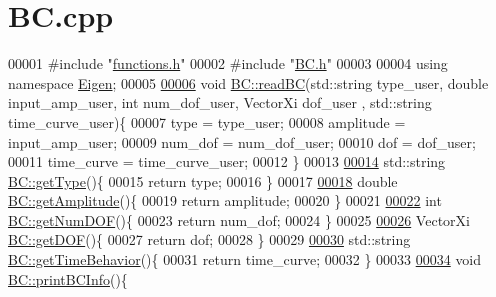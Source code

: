 \hypertarget{_b_c_8cpp_source}{}\section{B\+C.\+cpp}
\label{_b_c_8cpp_source}

\begin{DoxyCode}
00001 \textcolor{preprocessor}{#include "\hyperlink{functions_8h}{functions.h}"}
00002 \textcolor{preprocessor}{#include "\hyperlink{_b_c_8h}{BC.h}"}
00003 
00004 \textcolor{keyword}{using namespace }\hyperlink{namespace_eigen}{Eigen};
00005 
\hyperlink{class_b_c_a8ceaa781f98b4128fa50611ff9481e1a}{00006} \textcolor{keywordtype}{void} \hyperlink{class_b_c_a8ceaa781f98b4128fa50611ff9481e1a}{BC::readBC}(std::string type\_user, \textcolor{keywordtype}{double} input\_amp\_user, \textcolor{keywordtype}{int} num\_dof\_user, VectorXi dof\_user
      , std::string time\_curve\_user)\{
00007   type = type\_user;
00008   amplitude = input\_amp\_user;
00009   num\_dof = num\_dof\_user;
00010   dof = dof\_user;
00011   time\_curve = time\_curve\_user;
00012 \}
00013 
\hyperlink{class_b_c_aa6afb3d4586f395578bef89c77e60449}{00014} std::string \hyperlink{class_b_c_aa6afb3d4586f395578bef89c77e60449}{BC::getType}()\{
00015   \textcolor{keywordflow}{return} type;
00016 \}
00017 
\hyperlink{class_b_c_ad648545e6ee046075350cd9b3c88e610}{00018} \textcolor{keywordtype}{double} \hyperlink{class_b_c_ad648545e6ee046075350cd9b3c88e610}{BC::getAmplitude}()\{
00019   \textcolor{keywordflow}{return} amplitude;
00020 \}
00021 
\hyperlink{class_b_c_a6e42c3db5c67435bf2616768959866e9}{00022} \textcolor{keywordtype}{int} \hyperlink{class_b_c_a6e42c3db5c67435bf2616768959866e9}{BC::getNumDOF}()\{
00023   \textcolor{keywordflow}{return} num\_dof;
00024 \}
00025 
\hyperlink{class_b_c_a0bc8eb90956a082ada5e4daa5e32c9fc}{00026} VectorXi \hyperlink{class_b_c_a0bc8eb90956a082ada5e4daa5e32c9fc}{BC::getDOF}()\{
00027   \textcolor{keywordflow}{return} dof;
00028 \}
00029 
\hyperlink{class_b_c_a3590d0a29a9261d99f21ee75340e5722}{00030} std::string \hyperlink{class_b_c_a3590d0a29a9261d99f21ee75340e5722}{BC::getTimeBehavior}()\{
00031   \textcolor{keywordflow}{return} time\_curve;
00032 \}
00033 
\hyperlink{class_b_c_a7f2fb6f9d3848e8f0617902b3fb804af}{00034} \textcolor{keywordtype}{void} \hyperlink{class_b_c_a7f2fb6f9d3848e8f0617902b3fb804af}{BC::printBCInfo}()\{

\end{DoxyCode}
